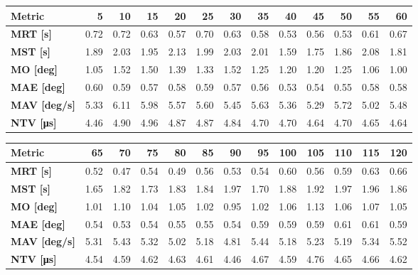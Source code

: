 \begin{tabular*}{\textwidth}{@{\extracolsep{\fill}}l|rrrrrrrrrrrr}
    \toprule
    \textbf{Metric} & \textbf{5} & \textbf{10} & \textbf{15} & \textbf{20} & \textbf{25} & \textbf{30} & \textbf{35} & \textbf{40} & \textbf{45} & \textbf{50} & \textbf{55} & \textbf{60} \\
    \midrule
    \textbf{MRT [s]} & 0.72 & 0.72 & 0.63 & 0.57 & 0.70 & 0.63 & 0.58 & 0.53 & 0.56 & 0.53 & 0.61 & 0.67 \\
    \textbf{MST [s]} & 1.89 & 2.03 & 1.95 & 2.13 & 1.99 & 2.03 & 2.01 & 1.59 & 1.75 & 1.86 & 2.08 & 1.81 \\
    \textbf{MO  [deg]} & 1.05 & 1.52 & 1.50 & 1.39 & 1.33 & 1.52 & 1.25 & 1.20 & 1.20 & 1.25 & 1.06 & 1.00 \\
    \textbf{MAE [deg]} & 0.60 & 0.59 & 0.57 & 0.58 & 0.59 & 0.57 & 0.56 & 0.53 & 0.54 & 0.55 & 0.58 & 0.58 \\
    \textbf{MAV [deg/s]} & 5.33 & 6.11 & 5.98 & 5.57 & 5.60 & 5.45 & 5.63 & 5.36 & 5.29 & 5.72 & 5.02 & 5.48 \\
    \textbf{NTV [\si{\micro\second}]} & 4.46 & 4.90 & 4.96 & 4.87 & 4.87 & 4.84 & 4.70 & 4.70 & 4.64 & 4.70 & 4.65 & 4.64 \\
    \bottomrule
\end{tabular*}

\begin{tabular*}{\textwidth}{@{\extracolsep{\fill}}l|rrrrrrrrrrrr}
    \toprule
    \textbf{Metric} & \textbf{65} & \textbf{70} & \textbf{75} & \textbf{80} & \textbf{85} & \textbf{90} & \textbf{95} & \textbf{100} & \textbf{105} & \textbf{110} & \textbf{115} & \textbf{120} \\
    \midrule
    \textbf{MRT [s]} & 0.52 & 0.47 & 0.54 & 0.49 & 0.56 & 0.53 & 0.54 & 0.60 & 0.56 & 0.59 & 0.63 & 0.66 \\
    \textbf{MST [s]} & 1.65 & 1.82 & 1.73 & 1.83 & 1.84 & 1.97 & 1.70 & 1.88 & 1.92 & 1.97 & 1.96 & 1.86 \\
    \textbf{MO  [deg]} & 1.01 & 1.10 & 1.04 & 1.05 & 1.02 & 0.95 & 1.02 & 1.06 & 1.13 & 1.06 & 1.07 & 1.05 \\
    \textbf{MAE [deg]} & 0.54 & 0.53 & 0.54 & 0.55 & 0.55 & 0.54 & 0.59 & 0.59 & 0.59 & 0.61 & 0.61 & 0.59 \\
    \textbf{MAV [deg/s]} & 5.31 & 5.43 & 5.32 & 5.02 & 5.18 & 4.81 & 5.44 & 5.18 & 5.23 & 5.19 & 5.34 & 5.52 \\
    \textbf{NTV [\si{\micro\second}]} & 4.54 & 4.59 & 4.62 & 4.63 & 4.61 & 4.46 & 4.67 & 4.59 & 4.76 & 4.65 & 4.66 & 4.62 \\
    \bottomrule
\end{tabular*}

